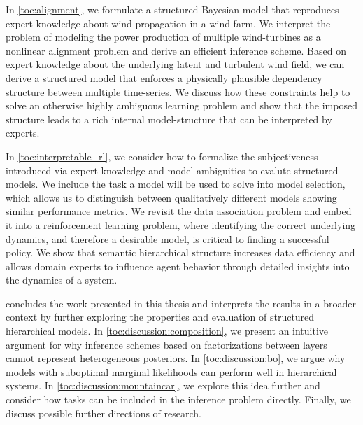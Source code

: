 In \cref{toc:alignment}, we formulate a structured Bayesian model that reproduces expert knowledge about wind propagation in a wind-farm.
We interpret the problem of modeling the power production of multiple wind-turbines as a nonlinear alignment problem and derive an efficient inference scheme.
Based on expert knowledge about the underlying latent and turbulent wind field, we can derive a structured model that enforces a physically plausible dependency structure between multiple time-series.
We discuss how these constraints help to solve an otherwise highly ambiguous learning problem and show that the imposed structure leads to a rich internal model-structure that can be interpreted by experts.

In \cref{toc:interpretable_rl}, we consider how to formalize the subjectiveness introduced via expert knowledge and model ambiguities to evalute structured models.
We include the task a model will be used to solve into model selection, which allows us to distinguish between qualitatively different models showing similar performance metrics.
We revisit the data association problem and embed it into a reinforcement learning problem, where identifying the correct underlying dynamics, and therefore a desirable model, is critical to finding a successful policy.
We show that semantic hierarchical structure increases data efficiency and allows domain experts to influence agent behavior through detailed insights into the dynamics of a system.

 concludes the work presented in this thesis and interprets the results in a broader context by further exploring the properties and evaluation of structured hierarchical models.
In \cref{toc:discussion:composition}, we present an intuitive argument for why inference schemes based on factorizations between layers cannot represent heterogeneous posteriors.
In \cref{toc:discussion:bo}, we argue why models with suboptimal marginal likelihoods can perform well in hierarchical systems.
In \cref{toc:discussion:mountaincar}, we explore this idea further and consider how tasks can be included in the inference problem directly.
Finally, we discuss possible further directions of research.


